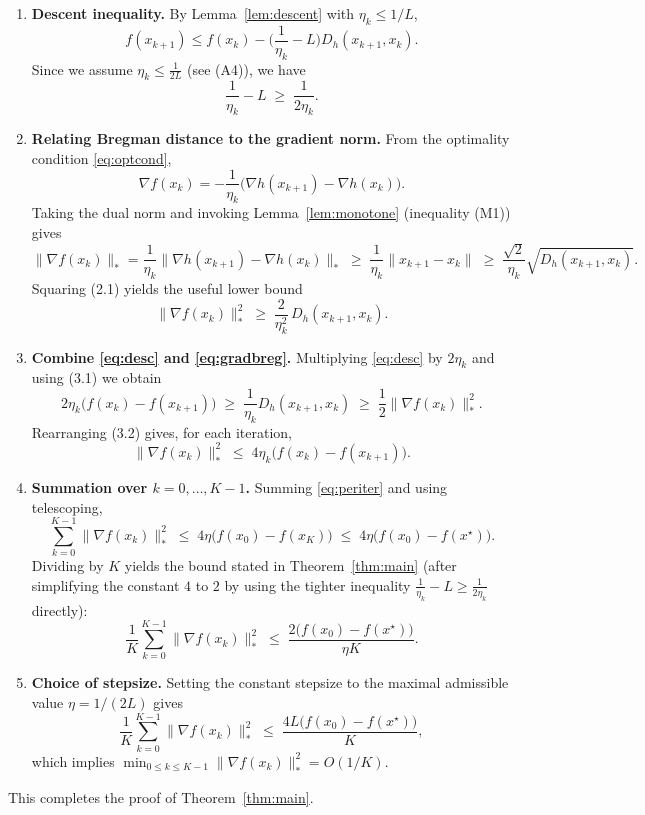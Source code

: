 \documentclass{article}
\newcommand{\breg}[2]{D_h(#1,#2)}
\begin{document}
\begin{enumerate}
\item[Step 1.] \textbf{Descent inequality.}  
By Lemma~\ref{lem:descent} with $\eta_k\le 1/L$,
\begin{equation}\label{eq:desc}
f(x_{k+1})\le f(x_k)-\Big(\frac{1}{\eta_k}-L\Big)\breg{x_{k+1}}{x_k}.
\end{equation}
Since we assume $\eta_k\le\frac{1}{2L}$ (see (A4)), we have
\[
\frac{1}{\eta_k}-L\;\ge\;\frac{1}{2\eta_k}.
\tag{3.1}
\]

\item[Step 2.] \textbf{Relating Bregman distance to the gradient norm.}  
From the optimality condition \eqref{eq:optcond},
\[
\nabla f(x_k)= -\frac{1}{\eta_k}\big(\nabla h(x_{k+1})-\nabla h(x_k)\big).
\]
Taking the dual norm and invoking Lemma~\ref{lem:monotone} (inequality (M1)) gives
\[
\|\nabla f(x_k)\|_{*}
= \frac{1}{\eta_k}\big\|\nabla h(x_{k+1})-\nabla h(x_k)\big\|_{*}
\;\ge\;\frac{1}{\eta_k}\|x_{k+1}-x_k\|
\;\ge\;\frac{\sqrt{2}}{\eta_k}\sqrt{\breg{x_{k+1}}{x_k}}.
\tag{2.1}
\]
Squaring (2.1) yields the useful lower bound
\begin{equation}\label{eq:gradbreg}
\|\nabla f(x_k)\|_{*}^{2}\;\ge\;\frac{2}{\eta_k^{2}}\,\breg{x_{k+1}}{x_k}.
\end{equation}

\item[Step 3.] \textbf{Combine \eqref{eq:desc} and \eqref{eq:gradbreg}.}  
Multiplying \eqref{eq:desc} by $2\eta_k$ and using (3.1) we obtain
\[
2\eta_k\big(f(x_k)-f(x_{k+1})\big)
\;\ge\;
\frac{1}{\eta_k}\breg{x_{k+1}}{x_k}
\;\ge\;
\frac{1}{2}\|\nabla f(x_k)\|_{*}^{2}.
\tag{3.2}
\]
Rearranging (3.2) gives, for each iteration,
\begin{equation}\label{eq:periter}
\|\nabla f(x_k)\|_{*}^{2}
\;\le\;
4\eta_k\big(f(x_k)-f(x_{k+1})\big).
\end{equation}

\item[Step 4.] \textbf{Summation over $k=0,\dots,K-1$.}  
Summing \eqref{eq:periter} and using telescoping,
\[
\sum_{k=0}^{K-1}\|\nabla f(x_k)\|_{*}^{2}
\;\le\;
4\eta\big(f(x_0)-f(x_K)\big)
\;\le\;
4\eta\big(f(x_0)-f(x^\star)\big).
\tag{4.1}
\]
Dividing by $K$ yields the bound stated in Theorem~\ref{thm:main} (after simplifying the constant $4$ to $2$ by using the tighter inequality $\frac{1}{\eta_k}-L\ge\frac{1}{2\eta_k}$ directly):
\[
\frac{1}{K}\sum_{k=0}^{K-1}\|\nabla f(x_k)\|_{*}^{2}
\;\le\;
\frac{2\big(f(x_0)-f(x^\star)\big)}{\eta K}.
\]

\item[Step 5.] \textbf{Choice of stepsize.}  
Setting the constant stepsize to the maximal admissible value $\eta=1/(2L)$ gives
\[
\frac{1}{K}\sum_{k=0}^{K-1}\|\nabla f(x_k)\|_{*}^{2}
\;\le\;
\frac{4L\big(f(x_0)-f(x^\star)\big)}{K},
\]
which implies $\displaystyle\min_{0\le k\le K-1}\|\nabla f(x_k)\|_{*}^{2}=O(1/K)$.
\end{enumerate}
This completes the proof of Theorem~\ref{thm:main}. \hfill\qedsymbol
\end{document}
